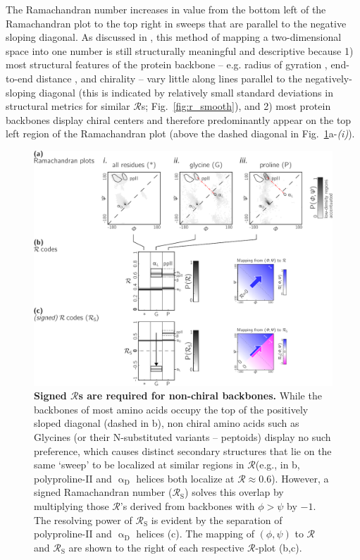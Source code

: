 \documentclass[fleqn,10pt,lineno]{wlpeerj} %
\newcommand{\Fig}[1]{Fig.~\ref{#1}}
\newcommand{\rr}{$\mathcal{R}$\xspace}
\begin{document}
The Ramachandran number increases in value from the bottom left of the Ramachandran plot to the top right in sweeps that are parallel to the negative sloping diagonal. As discussed in \cite{Mannige2016}, this method of mapping a two-dimensional space into one number is still structurally meaningful and descriptive because 1) most structural features of the protein backbone -- e.g. radius of gyration \citep{Mannige2016}, end-to-end distance \citep{Mannige2016}, and chirality \citep{Mannige2017} -- vary little along lines parallel to the negatively-sloping diagonal (this is indicated by relatively small standard deviations in structural metrics for similar {\rr}s; \Fig{fig:r_smooth}), and 2) most protein backbones display chiral centers and therefore predominantly appear on the top left region of the Ramachandran plot (above the dashed diagonal in \Fig{fig:signed}a-{\it(i)}).

\begin{figure}[t!]
\includegraphics[width=1.0\linewidth]{figures/signed4.pdf}
\caption{\textbf{Signed {\rr}s are required for non-chiral backbones.} While the backbones of most amino acids occupy the top of the positively sloped diagonal (dashed in b), non chiral amino acids such as Glycines (or their N-substituted variants -- peptoids) display no such preference, which causes distinct secondary structures that lie on the same `sweep' to be localized at similar regions in \rr (e.g., in b, polyproline-II and $\upalpha_\textrm{D}$ helices both localize at \rr $\approx 0.6$). However, a signed Ramachandran number ($\mathcal{R}_\textrm{S}$) solves this overlap by multiplying those \rr's derived from backbones with $\phi > \psi$ by $-1$. The resolving power of $\mathcal{R}_\textrm{S}$ is evident by the separation of polyproline-II and $\upalpha_\textrm{D}$ helices (c). The mapping of $(\phi,\psi)$ to $\mathcal{R}$ and $\mathcal{R}_\textrm{S}$ are shown to the right of each respective \rr-plot (b,c).\label{fig:signed}} 
\end{figure}
\end{document}
